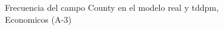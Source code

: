 \begin{figure}[H]
    \centering
    
    \caption{Frecuencia del campo County en el modelo real y tddpm, Economicos (A-3)}
    \label{frecuency-County-tddpm_mlp}
\end{figure}